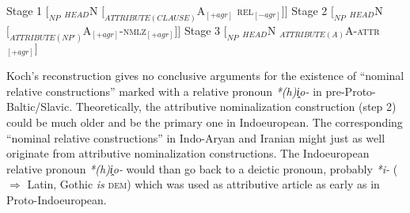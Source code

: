 \begin{exe}
\ex 
\begin{xlist}
\ex Stage 1 $[_{NP}$ $_{HEAD}$N $[_{ATTRIBUTE(CLAUSE)}$A$_{[+{agr}]}$ \textsc{rel}$_{[-{agr}]}$$] ]$
\ex Stage 2 $[_{NP}$ $_{HEAD}$N $[_{ATTRIBUTE(NP')}$A$_{[+{agr}]}$-\textsc{nmlz}$_{[+{agr}]}$$] ]$ \label{koch constit nomzr}
\ex Stage 3 $[_{NP}$ $_{HEAD}$N $_{ATTRIBUTE(A)}$A-\textsc{attr}$_{[+{agr}]}$$]$
\end{xlist}
\end{exe}
Koch's reconstruction gives no conclusive arguments for the existence of “nominal relative constructions” marked with a relative pronoun \textit{*(h)i̭o-} in pre-Proto-Baltic/Slavic. Theoretically, the attributive nominalization construction (step 2) could be much older and be the primary one in Indoeuropean. The corresponding “nominal relative constructions” in Indo-Aryan and Iranian might just as well originate from attributive nominalization constructions. The Indoeuropean relative pronoun \textit{*(h)i̭o-} would than go back to a deictic pronoun, probably \textit{*i-} ($\Rightarrow$ Latin, Gothic \textit{is} \textsc{dem}) which was used as attributive article as early as in Proto-Indoeuropean.


